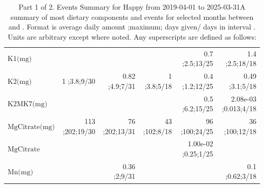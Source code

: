 \begin{table}[H]
\begin{tabular}{|l|r|r|r|r|r|}
$\textrm{K1(mg)}$&&&&0.7 ;2.5;13/25&1.4 ;2.5;18/18\\
$\textrm{K2(mg)}$&1 ;3.8;9/30&0.82 ;4.9;7/31&1 ;3.8;5/18&0.4 ;1.2;12/25&0.49 ;3.1;5/18\\
$\textrm{K2MK7(mg)}$&&&&0.5 ;6.2;15/25&2.08e-03 ;0.013;4/18\\
$\textrm{MgCitrate(mg)}$&113 ;202;19/30&76 ;202;13/31&43 ;102;8/18&96 ;100;24/25&36 ;100;12/18\\
$\textrm{MgCitrate}$&&&&1.00e-02 ;0.25;1/25&\\
$\textrm{Mn(mg)}$&&0.36 ;2;9/31&&&0.1 ;0.62;3/18\\
\hline
\end{tabular}
\caption{Part 1 of 2.  Events Summary for Happy   from 2019-04-01 to 2025-03-31A summary of most dietary components and events  for selected months between \mjmdatemin and \mjmdatemax. Format is average daily amount ;maximum; days given/ days in interval . Units are arbitrary except where noted. Any  superscripts are defined as follows:  \mjmsuperscripts}
\end{table}
